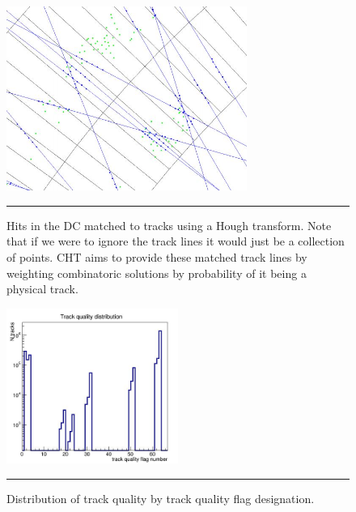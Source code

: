 \begin{figure}[htbp!]
  \centering
    \includegraphics[width=0.7\textwidth]{Figures/houghtransformcartoon.JPG}
    \rule{35em}{0.5pt}
  \caption[Hits in the DC matched to tracks using a Hough transform]{Hits in the DC matched to tracks using a Hough transform. Note that if we were to ignore the track lines it would just be a collection of points. CHT aims to provide these matched track lines by weighting combinatoric solutions by probability of it being a physical track.}
  \label{fig:houghtransform}
\end{figure}

\begin{figure}[htbp!]
  \centering
    \includegraphics[width=0.5\textwidth]{evtQA/trackqualitydist.JPG}
    \rule{35em}{0.5pt}
  \caption[Distribution of track quality.]{Distribution of track quality by track quality flag designation.}
  \label{fig:trkquality}
\end{figure}

